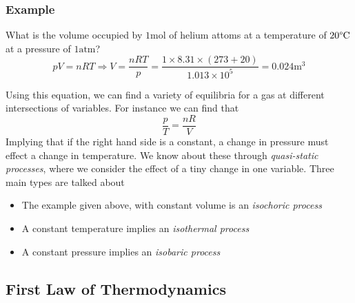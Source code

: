 \documentclass[12pt]{report}
\begin{document}
\begin{flushleft}
\subsubsection*{Example}
What is the volume occupied by \(1\mathrm{mol}\) of helium attoms at a
temperature of \(20\degree\mathrm{C}\) at a pressure of \(1\mathrm{atm}\)?
\[pV = nRT \Rightarrow V = \frac{nRT}{p} 
= \frac{1\times8.31\times(273 + 20)}{1.013\times10^5} = 0.024\mathrm{m}^3\]

\bigskip
Using this equation, we can find a variety of equilibria for a gas at different
intersections of variables. For instance we can find that
\[\frac{p}{T} = \frac{nR}{V}\]
Implying that if the right hand side is a constant, a change in pressure must
effect a change in temperature. We know about these through
\textit{quasi-static processes}, where we consider the effect of a tiny change
in one variable. Three main types are talked about

\begin{itemize}
    \item The example given above, with constant volume is an
        \textit{isochoric process}
    \item A constant temperature implies an \textit{isothermal process}
    \item A constant pressure implies an \textit{isobaric process}
\end{itemize}

\subsection*{First Law of Thermodynamics}


\end{flushleft}
\end{document}
